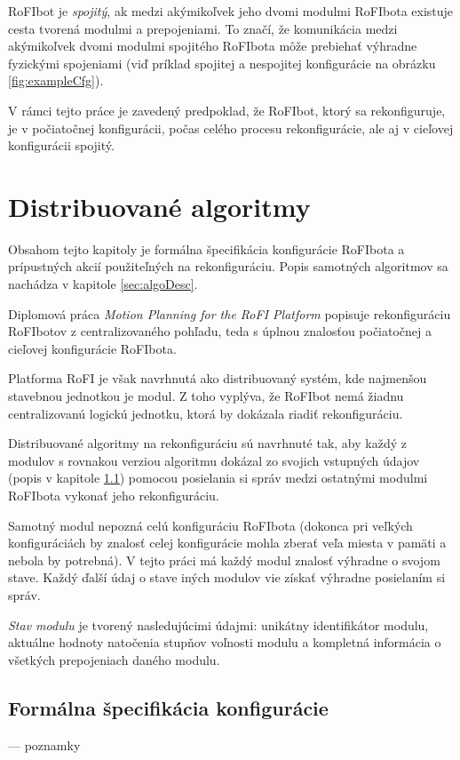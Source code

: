 \documentclass[
  digital, %
  twoside, %
  table,   %
  nolof,     %
  nolot,     %
]{fithesis3}
\begin{document}
RoFIbot je \textit{spojitý}, ak medzi akýmikoľvek jeho dvomi modulmi RoFIbota existuje cesta tvorená modulmi a prepojeniami. To značí, že komunikácia medzi akýmikoľvek dvomi modulmi spojitého RoFIbota môže prebiehať výhradne fyzickými spojeniami (viď príklad spojitej a nespojitej konfigurácie na obrázku \ref{fig:exampleCfg}). 

V rámci tejto práce je zavedený predpoklad, že RoFIbot, ktorý sa rekonfiguruje, je v počiatočnej konfigurácii, počas celého procesu rekonfigurácie, ale aj v cieľovej konfigurácii spojitý. 

\chapter{Distribuované algoritmy}
\label{sec:distributedAlgo}
Obsahom tejto kapitoly je formálna špecifikácia konfigurácie RoFIbota a prípustných akcií použiteľných na rekonfiguráciu. Popis samotných algoritmov sa nachádza v kapitole \ref{sec:algoDesc}. 

Diplomová práca \textit{Motion Planning for the RoFI Platform} \cite{vozarovaMasterThesis} popisuje rekonfiguráciu RoFIbotov z centralizovaného pohľadu, teda s úplnou znalosťou počiatočnej a cieľovej konfigurácie RoFIbota. 

Platforma RoFI je však navrhnutá ako distribuovaný systém, kde najmenšou stavebnou jednotkou je modul. Z toho vyplýva, že RoFIbot nemá žiadnu centralizovanú logickú jednotku, ktorá by dokázala riadiť rekonfiguráciu. 

Distribuované algoritmy na rekonfiguráciu sú navrhnuté tak, aby každý z modulov s rovnakou verziou algoritmu dokázal zo svojich vstupných údajov (popis v kapitole \ref{sec:inputOutput}) pomocou posielania si správ medzi ostatnými modulmi RoFIbota vykonať jeho rekonfiguráciu. 

Samotný modul nepozná celú konfiguráciu RoFIbota (dokonca pri veľkých konfiguráciách by znalosť celej konfigurácie mohla zberať veľa miesta v pamäti a nebola by potrebná). V tejto práci má každý modul znalosť výhradne o svojom stave. Každý ďalší údaj o stave iných modulov vie získať výhradne posielaním si správ. 

\textit{Stav modulu} je tvorený nasledujúcimi údajmi: unikátny identifikátor modulu, aktuálne hodnoty natočenia stupňov voľnosti modulu a kompletná informácia o všetkých prepojeniach daného modulu. 

\section{Formálna špecifikácia konfigurácie}
\label{sec:inputOutput}
--- poznamky
\end{document}

